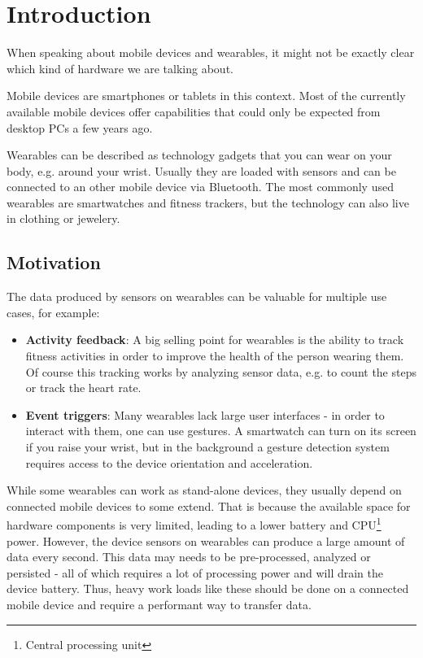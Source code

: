 \section{Introduction}
\label{sec:intro}

When speaking about mobile devices and wearables, it might not be exactly clear which kind of hardware we are talking about.

Mobile devices are smartphones or tablets in this context. Most of the currently available mobile devices offer capabilities that could only be expected from desktop PCs a few years ago.

Wearables can be described as technology gadgets that you can wear on your body, e.g. around your wrist.
Usually they are loaded with sensors and can be connected to an other mobile device via Bluetooth.
The most commonly used wearables are smartwatches and fitness trackers, but the technology can also live in clothing or jewelery.


\subsection{Motivation}
\label{sec:intro:motivation}

The data produced by sensors on wearables can be valuable for multiple use cases, for example:
\begin{itemize}[noitemsep]
	\item \textbf{Activity feedback}:
	A big selling point for wearables is the ability to track fitness activities in order to improve the health of the person wearing them.
	Of course this tracking works by analyzing sensor data, e.g. to count the steps or track the heart rate.
	\item \textbf{Event triggers}:
	Many wearables lack large user interfaces - in order to interact with them, one can use gestures.
	A smartwatch can turn on its screen if you raise your wrist, but in the background a gesture detection system requires access to the device orientation and acceleration.
\end{itemize}

While some wearables can work as stand-alone devices, they usually depend on connected mobile devices to some extend.
That is because the available space for hardware components is very limited, leading to a lower battery and CPU\footnote{Central processing unit} power.
However, the device sensors on wearables can produce a large amount of data every second.
This data may needs to be pre-processed, analyzed or persisted - all of which requires a lot of processing power and will drain the device battery.
Thus, heavy work loads like these should be done on a connected mobile device and require a performant way to transfer data.

